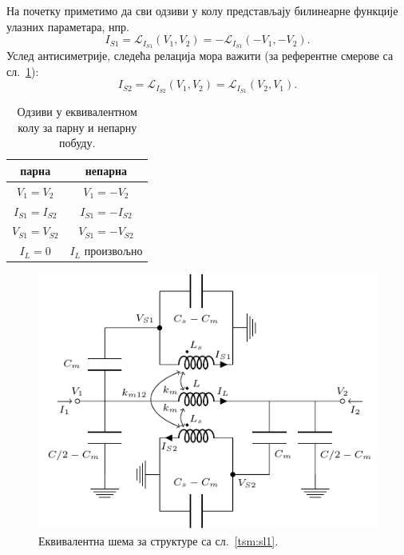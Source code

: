На почетку приметимо да сви одзиви у колу представљају билинеарне функције улазних параметара, нпр.
\begin{equation}
I_{S1} = \mathcal{L}_{I_{S1}}(V_1,V_2) = -\mathcal{L}_{I_{S1}}(-V_1,-V_2).
\label{tsm:blin1}\end{equation}
Услед антисиметрије, следећа релација мора важити (за референтне смерове са сл.~\ref{tsm:sl3}):
\begin{equation}
    I_{S2}=\mathcal{L}_{I_{S2}}(V_1,V_2)=\mathcal{L}_{I_{S1}}(V_2,V_1).
\label{tsm:blin2}\end{equation}
\begin{table}[!t]
\renewcommand{\arraystretch}{1.3}
\caption{Одзиви у еквивалентном колу за парну и непарну побуду.}
\label{tsm:tabela_uslovi}
\centering
\begin{tabular}{|c|c|}
\hline
парна & непарна \\
\hline
$V_1 = V_2$ & $V_1 = -V_2$ \\
\hline
$I_{S1} = I_{S2}$ & $I_{S1} = -I_{S2}$ \\
\hline
$V_{S1} = V_{S2}$ & $V_{S1} = -V_{S2}$ \\
\hline
$I_L = 0$ & $I_L$ произвољно\\
\hline
\end{tabular}
\end{table}
\begin{figure}
    \begin{center}
        \includegraphics[scale=1]{sl_tsm/sl3.pdf}
    \caption{Еквивалентна шема за структуре са сл.~\ref{tsm:sl1}.}
    \label{tsm:sl3}
  \end{center}
\end{figure}
